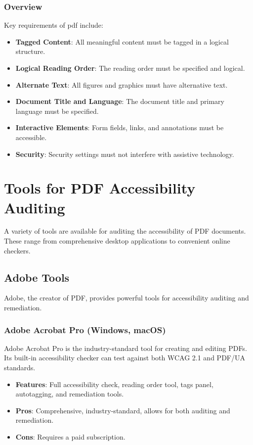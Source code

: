\subsubsection{Overview}
\label{ssubsec:pdf-ua-overview}
Key requirements of \gls{pdf} include:
\begin{itemize}
	\item \textbf{Tagged Content}: All meaningful content must be tagged in a logical structure.
	\item \textbf{Logical Reading Order}: The reading order must be specified and logical.
	\item \textbf{Alternate Text}: All figures and graphics must have alternative text.
	\item \textbf{Document Title and Language}: The document title and primary language must be specified.
	\item \textbf{Interactive Elements}: Form fields, links, and annotations must be accessible.
	\item \textbf{Security}: Security settings must not interfere with assistive technology.
\end{itemize}

\section{Tools for PDF Accessibility Auditing}
\label{sec:pdf-auditing-tools}
A variety of tools are available for auditing the accessibility of PDF documents. These range from comprehensive desktop  applications to convenient online  checkers.

\subsection{Adobe Tools}
\label{subsec:adobe-tools}
Adobe, the creator of PDF, provides powerful tools for accessibility auditing and remediation.

\subsubsection{Adobe Acrobat Pro (Windows, macOS)}
\label{ssubsec:adobe-acrobat-pro}
Adobe Acrobat Pro is the industry-standard tool for creating and editing PDFs. Its built-in accessibility checker can test against both WCAG 2.1 and PDF/UA standards.
\begin{itemize}
	\item \textbf{Features}: Full accessibility check, reading order tool, tags panel, autotagging, and remediation tools.
	\item \textbf{Pros}: Comprehensive, industry-standard, allows for both auditing and remediation.
	\item \textbf{Cons}: Requires a paid subscription.
\end{itemize}

